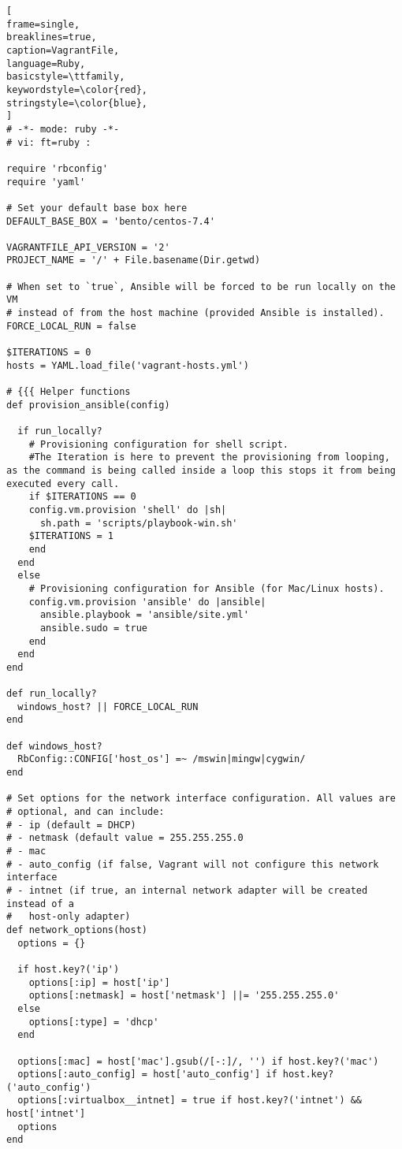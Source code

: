 \label{ch:bijlagen}

\newpage
\begin{lstlisting}[
frame=single,
breaklines=true,
caption=VagrantFile,
language=Ruby,
basicstyle=\ttfamily,
keywordstyle=\color{red},
stringstyle=\color{blue},
]
# -*- mode: ruby -*-
# vi: ft=ruby :

require 'rbconfig'
require 'yaml'

# Set your default base box here
DEFAULT_BASE_BOX = 'bento/centos-7.4'

VAGRANTFILE_API_VERSION = '2'
PROJECT_NAME = '/' + File.basename(Dir.getwd)

# When set to `true`, Ansible will be forced to be run locally on the VM
# instead of from the host machine (provided Ansible is installed).
FORCE_LOCAL_RUN = false

$ITERATIONS = 0
hosts = YAML.load_file('vagrant-hosts.yml')

# {{{ Helper functions
def provision_ansible(config)

  if run_locally?
    # Provisioning configuration for shell script.
    #The Iteration is here to prevent the provisioning from looping, as the command is being called inside a loop this stops it from being executed every call.
    if $ITERATIONS == 0
    config.vm.provision 'shell' do |sh|
      sh.path = 'scripts/playbook-win.sh'
    $ITERATIONS = 1
    end
  end
  else
    # Provisioning configuration for Ansible (for Mac/Linux hosts).
    config.vm.provision 'ansible' do |ansible|
      ansible.playbook = 'ansible/site.yml'
      ansible.sudo = true
    end
  end
end

def run_locally?
  windows_host? || FORCE_LOCAL_RUN
end

def windows_host?
  RbConfig::CONFIG['host_os'] =~ /mswin|mingw|cygwin/
end

# Set options for the network interface configuration. All values are
# optional, and can include:
# - ip (default = DHCP)
# - netmask (default value = 255.255.255.0
# - mac
# - auto_config (if false, Vagrant will not configure this network interface
# - intnet (if true, an internal network adapter will be created instead of a
#   host-only adapter)
def network_options(host)
  options = {}

  if host.key?('ip')
    options[:ip] = host['ip']
    options[:netmask] = host['netmask'] ||= '255.255.255.0'
  else
    options[:type] = 'dhcp'
  end

  options[:mac] = host['mac'].gsub(/[-:]/, '') if host.key?('mac')
  options[:auto_config] = host['auto_config'] if host.key?('auto_config')
  options[:virtualbox__intnet] = true if host.key?('intnet') && host['intnet']
  options
end


\end{lstlisting}
